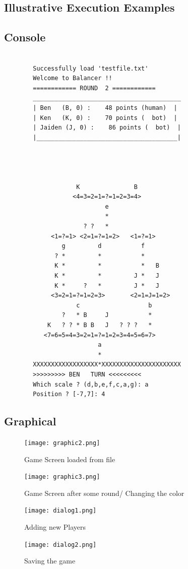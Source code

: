 \documentclass[12pt]{article}
\begin{document}
\begin{appendices}
\section{Illustrative Execution Examples}

\subsection{Console}
\begin{verbatim}

        Successfully load 'testfile.txt'
        Welcome to Balancer !!
        ============ ROUND  2 ============
        _________________________________________
        | Ben   (B, 0) :    48 points (human)  |
        | Ken   (K, 0) :    70 points (  bot)  |
        | Jaiden (J, 0) :    86 points (  bot)  |
        |_______________________________________|




                    K               B
                   <4=3=2=1=?=1=2=3=4>
                            e
                            *
                      ? ?   *
             <1=?=1> <2=1=?=1=2>   <1=?=1>
                g         d           f
              ? *         *           *
              K *         *           *   B
              K *         *         J *   J
              K *     ?   *         J *   J
             <3=2=1=?=1=2=3>       <2=1=J=1=2>
                    c                   b
                ?   * B     J           *
            K   ? ? * B B   J   ? ? ?   *
           <7=6=5=4=3=2=1=?=1=2=3=4=5=6=7>
                          a
                          *
        XXXXXXXXXXXXXXXXXX*XXXXXXXXXXXXXXXXXXXXXX
        >>>>>>>>> BEN   TURN <<<<<<<<<
        Which scale ? (d,b,e,f,c,a,g): a
        Position ? [-7,7]: 4
\end{verbatim}

\subsection{Graphical}
\begin{figure}
    \centering
    \caption{Game Screen loaded from file}
    \texttt{[image: graphic2.png]}
    \label{fig:gra3}
\end{figure}

\begin{figure}
    \centering
    \caption{Game Screen after some round/ Changing the color}
    \texttt{[image: graphic3.png]}
    \label{fig:gra3}
\end{figure}
\begin{figure}
    \centering
    \caption{Adding new Players}
    \texttt{[image: dialog1.png]}
    \label{fig:dia1}
\end{figure}

\begin{figure}
    \centering
    \caption{Saving the game}
    \texttt{[image: dialog2.png]}
    \label{fig:dia2}
\end{figure}

\end{appendices}
\end{document}

